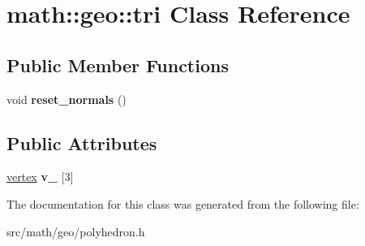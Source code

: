 \hypertarget{classmath_1_1geo_1_1tri}{
\section{math::geo::tri Class Reference}
\label{classmath_1_1geo_1_1tri}
}
\subsection*{Public Member Functions}
\begin{DoxyCompactItemize}
\item 
\hypertarget{classmath_1_1geo_1_1tri_a9781ddeac1d6e0795ede6818f1ca52b8}{
void {\bfseries reset\_\-normals} ()}
\label{classmath_1_1geo_1_1tri_a9781ddeac1d6e0795ede6818f1ca52b8}

\end{DoxyCompactItemize}
\subsection*{Public Attributes}
\begin{DoxyCompactItemize}
\item 
\hypertarget{classmath_1_1geo_1_1tri_a1578bb4ca85d7adabc44b48e1fbbbe29}{
\hyperlink{classmath_1_1geo_1_1vertex}{vertex} {\bfseries v\_\-} \mbox{[}3\mbox{]}}
\label{classmath_1_1geo_1_1tri_a1578bb4ca85d7adabc44b48e1fbbbe29}

\end{DoxyCompactItemize}


The documentation for this class was generated from the following file:\begin{DoxyCompactItemize}
\item 
src/math/geo/polyhedron.h\end{DoxyCompactItemize}
